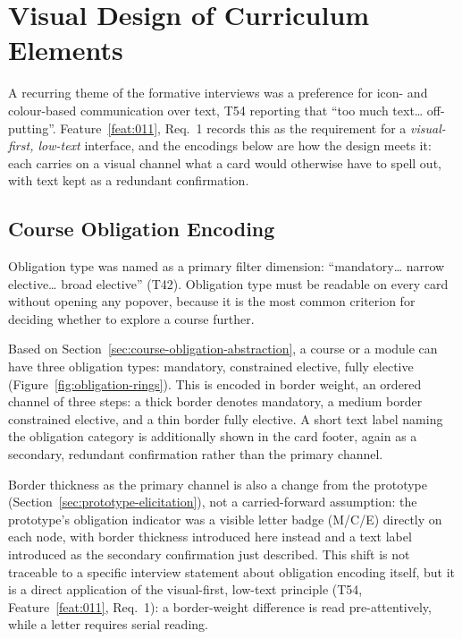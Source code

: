 \section{Visual Design of Curriculum Elements}
\label{sec:visual}
A recurring theme of the formative interviews was a preference for icon- and colour-based communication over text, T54 reporting that \enquote{too much text… off-putting}. Feature~\ref{feat:011}, Req.~1 records this as the requirement for a \emph{visual-first, low-text} interface, and the encodings below are how the design meets it: each carries on a visual channel what a card would otherwise have to spell out, with text kept as a redundant confirmation.


\subsection{Course Obligation Encoding}
\label{sec:obligation}

Obligation type was named as a primary filter dimension: \enquote{mandatory… narrow elective… broad elective} (T42). Obligation type must be readable on every card without opening any popover, because it is the most common criterion for deciding whether to explore a course further.

Based on Section~\ref{sec:course-obligation-abstraction}, a course or a module can have three obligation types: mandatory, constrained elective, fully elective (Figure~\ref{fig:obligation-rings}). This is encoded in border weight, an ordered channel of three steps: a thick border denotes mandatory, a medium border constrained elective, and a thin border fully elective. A short text label naming the obligation category is additionally shown in the card footer, again as a secondary, redundant confirmation rather than the primary channel.

Border thickness as the primary channel is also a change from the prototype (Section~\ref{sec:prototype-elicitation}), not a carried-forward assumption: the prototype's obligation indicator was a visible letter badge (M/C/E) directly on each node, with border thickness introduced here instead and a text label introduced as the secondary confirmation just described. This shift is not traceable to a specific interview statement about obligation encoding itself, but it is a direct application of the visual-first, low-text principle (T54, Feature~\ref{feat:011}, Req.~1): a border-weight difference is read pre-attentively, while a letter requires serial reading.


